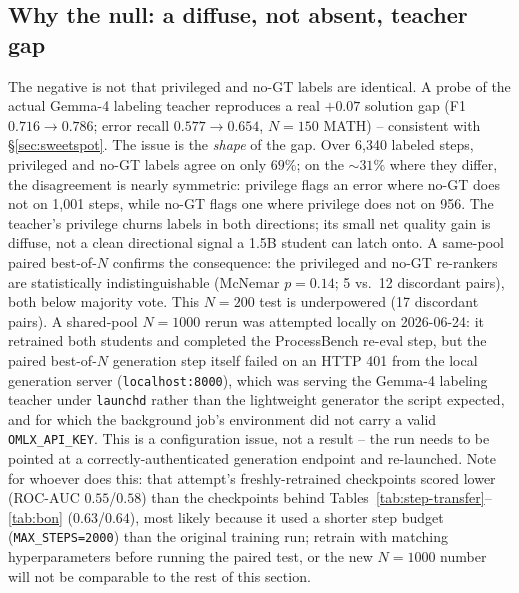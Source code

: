 \documentclass[11pt]{article}
\begin{document}
\subsection{Why the null: a diffuse, not absent, teacher gap}
\label{sec:diffuse}
The negative is not that privileged and no-GT labels are identical. A probe
of the actual Gemma-4 labeling teacher reproduces a real $+0.07$
solution gap (F1 $0.716 \to 0.786$; error recall $0.577 \to 0.654$, $N=150$
MATH) -- consistent with \S\ref{sec:sweetspot}. The issue is the
\emph{shape} of the gap. Over 6{,}340 labeled steps, privileged and no-GT
labels agree on only $69\%$; on the $\sim 31\%$ where they differ, the
disagreement is nearly symmetric: privilege flags an error where no-GT does
not on 1{,}001 steps, while no-GT flags one where privilege does not on
956. The teacher's privilege churns labels in both directions; its small net
quality gain is diffuse, not a clean directional signal a 1.5B student can
latch onto. A same-pool paired best-of-$N$ confirms the consequence: the
privileged and no-GT re-rankers are statistically indistinguishable
(McNemar $p=0.14$; 5 vs.\ 12 discordant pairs), both below majority vote.
This $N=200$ test is underpowered (17 discordant pairs). A shared-pool
$N=1000$ rerun was attempted locally on 2026-06-24: it retrained both
students and completed the ProcessBench re-eval step, but the paired
best-of-$N$ generation step itself failed on an HTTP 401 from the local
generation server (\texttt{localhost:8000}), which was serving the Gemma-4
labeling teacher under \texttt{launchd} rather than the lightweight
generator the script expected, and for which the background job's
environment did not carry a valid \texttt{OMLX\_API\_KEY}. This is a
configuration issue, not a result -- the run needs to be pointed at a
correctly-authenticated generation endpoint and re-launched. Note for
whoever does this: that attempt's freshly-retrained checkpoints scored
lower (ROC-AUC $0.55$/$0.58$) than the checkpoints behind
Tables~\ref{tab:step-transfer}--\ref{tab:bon} ($0.63$/$0.64$), most likely
because it used a shorter step budget (\texttt{MAX\_STEPS=2000}) than the
original training run; retrain with matching hyperparameters before running
the paired test, or the new $N=1000$ number will not be comparable to the
rest of this section.
\end{document}
